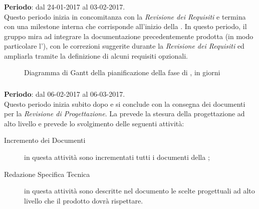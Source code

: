	\subsubsection{\ARI} \label{sec:ARI}
	\textbf{Periodo}: dal 24-01-2017 al 03-02-2017.
	\\ Questo periodo inizia in concomitanza con la \emph{Revisione dei Requisiti} e termina con una milestone interna che corrisponde all'inizio della \PA. In questo periodo, il gruppo mira ad integrare la documentazione precedentemente prodotta (in modo particolare l'\AR), con le correzioni suggerite durante la \emph{Revisione dei Requisiti} ed ampliarla tramite la definizione di alcuni requisiti opzionali.



\begin{figure}[H]
\label{tab:genweeks}
\caption{Diagramma di Gantt della pianificazione della fase di \ARI, in giorni}
\end{figure}

	
	\subsubsection{\PA} \label{sec:PA}
	\textbf{Periodo}: dal 06-02-2017 al 06-03-2017.	
	\\ Questo periodo inizia subito dopo \ARI{} e si conclude con la consegna dei documenti per la \emph{Revisione di Progettazione}. La \PA{} prevede la stesura della progettazione ad alto livello e prevede lo svolgimento delle seguenti attività:
	\begin{description}
		\item[Incremento dei Documenti] in questa attività sono incrementati tutti i documenti della \PA{};
		\item[Redazione Specifica Tecnica] in questa attività sono descritte nel documento le scelte progettuali ad alto livello che il prodotto dovrà rispettare.
	\end{description}
	

